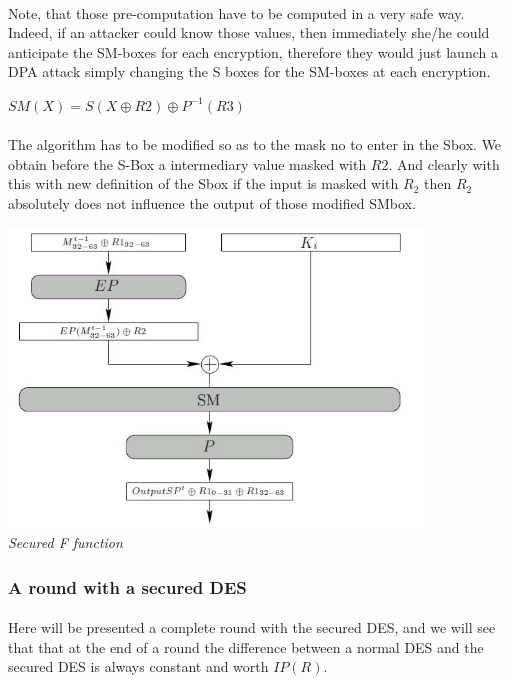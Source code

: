 \paragraph*{}
Note, that those pre-computation have to be computed in a very safe way.
Indeed, if an attacker could know those values, then immediately she/he could 
anticipate the SM-boxes for each encryption, therefore they would just launch a DPA 
attack simply changing the S boxes for the SM-boxes at each encryption.

\begin{center}
$SM(X)=S(X \oplus R2) \oplus P^{-1}( R3)$
\end{center}

\paragraph*{}
The algorithm has to be modified so as to the mask no to enter in the Sbox.
We obtain before the S-Box a intermediary value masked with $R2$. And clearly with this with 
new definition of the Sbox if the input is masked with $R_2$ 
then $R_2$ absolutely does not influence the output of those modified SMbox.


\begin{center}
\includegraphics[width=110mm]{images/functionFsecured.jpg}\\
\textit{Secured F function}
\end{center}


\subsubsection{A round with a secured DES}

\paragraph*{} Here will be presented a complete round with the secured DES, 
and we will see that that at the end of a round the difference between a normal DES and 
the secured DES is always constant and worth $IP(R)$.
\vspace{5mm}

